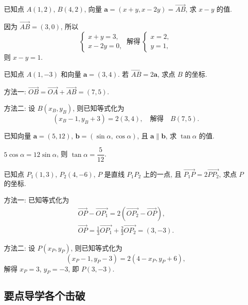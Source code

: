 \begin{exercise}
    已知点 $A(1,2)$, $B(4,2)$, 向量 $\bm{a}=(x+y,x-2y)=\overrightarrow{AB}$, 求 $x-y$ 的值.
\end{exercise}
\beginsolution
    因为 $\overrightarrow{AB}= (3,0)$, 所以
    \[\left\{\!\!\begin{array}{l}
        x+y= 3,\\
        x-2y= 0,
    \end{array}\right.\ \text{解得}\ 
    \left\{\!\!\begin{array}{l}
        x=2,\\
        y=1,
    \end{array}\right.\]
    则 $x-y=1$.
\endsolution

\begin{exercise}
    已知点 $A(1,-3)$ 和向量 $\bm{a}=(3,4)$. 若 $\overrightarrow{AB}=2\bm{a}$, 求点 $B$ 的坐标.
\end{exercise}
\beginsolution
    方法一: $\overrightarrow{OB}= \overrightarrow{OA}+\overrightarrow{AB}= (7,5)$.

    方法二: 设 $B(x_B,y_B)$, 则已知等式化为
    \[(x_B-1,y_B+3)= 2(3,4),\quad\text{解得}\quad
        B(7,5).\]
\endsolution

\begin{exercise}
    已知向量 $\bm{a}=(5,12)$, $\bm{b}=(\sin\alpha,\cos\alpha)$, 
    且 $\bm{a}\parallel\bm{b}$, 求 $\tan\alpha $ 的值.
\end{exercise}
\beginsolution
    $5\cos\alpha= 12\sin\alpha$, 则 $\tan\alpha= \dfrac5{12}$.
\endsolution

\begin{exercise}
    已知点 $P_1(1,3)$, $P_2(4,-6)$, $P$ 是直线 $P_1P_2$ 上的一点, 且 $\overrightarrow{P_1P}= 2\overrightarrow{PP_2}$, 求点 $P$ 的坐标.
\end{exercise}
\beginsolution
    方法一: 已知等式化为
    \[\begin{gathered}
        \overrightarrow{OP}-\overrightarrow{OP_1}
        = 2(\overrightarrow{OP_2}- \overrightarrow{OP}),\\
        \overrightarrow{OP}
        = \frac13\overrightarrow{OP_1}+ \frac23\overrightarrow{OP_2}
        = (3,-3).
    \end{gathered}\]

    方法二: 设 $P(x_P,y_P)$, 则已知等式化为
    \[(x_P-1,y_P-3)= 2(4-x_P,y_P+6),\]
    解得 $x_P= 3$, $y_P= -3$, 即 $P(3,-3)$.
\endsolution

\subsection{要点导学\quad 各个击破}
